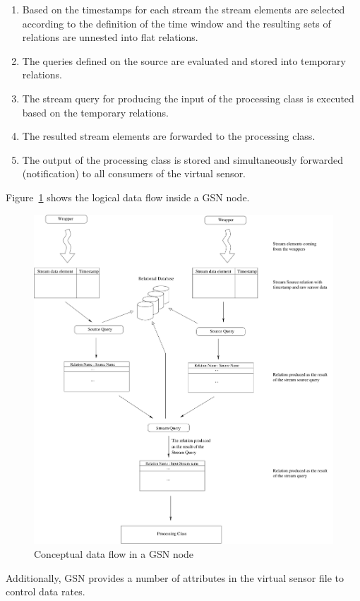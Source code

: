 \begin{enumerate}
\item Based on the timestamps for each stream the stream elements are
  selected according to the definition of the time window and the resulting
  sets of relations are unnested into flat relations.
\item The queries defined on the source are evaluated and stored into temporary
  relations.
\item The stream query for producing the input of the processing class is executed
  based on the temporary relations.
\item The resulted stream elements are forwarded to the processing class.
\item The output of the processing class is stored and simultaneously forwarded (notification) to
 all consumers of the virtual sensor.
\end{enumerate}

Figure~\ref{fig:ConceptualDataFlow} shows the logical data flow inside
a GSN node.

\begin{figure}%
  \centering
  \includegraphics[width=0.7\columnwidth]{ch-gsn-figures/conceptual-dataflow}
  \caption{Conceptual data flow in a GSN node}
  \label{fig:ConceptualDataFlow}
\end{figure}

Additionally, GSN provides a number of attributes in the virtual sensor file to control data rates.

